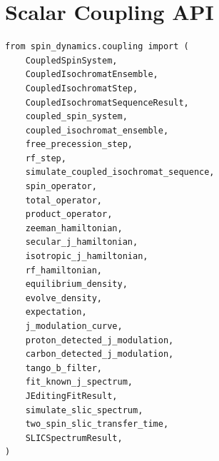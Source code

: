\documentclass[11pt,oneside]{report}
\begin{document}
\section{Scalar Coupling API}

\begin{lstlisting}
from spin_dynamics.coupling import (
    CoupledSpinSystem,
    CoupledIsochromatEnsemble,
    CoupledIsochromatStep,
    CoupledIsochromatSequenceResult,
    coupled_spin_system,
    coupled_isochromat_ensemble,
    free_precession_step,
    rf_step,
    simulate_coupled_isochromat_sequence,
    spin_operator,
    total_operator,
    product_operator,
    zeeman_hamiltonian,
    secular_j_hamiltonian,
    isotropic_j_hamiltonian,
    rf_hamiltonian,
    equilibrium_density,
    evolve_density,
    expectation,
    j_modulation_curve,
    proton_detected_j_modulation,
    carbon_detected_j_modulation,
    tango_b_filter,
    fit_known_j_spectrum,
    JEditingFitResult,
    simulate_slic_spectrum,
    two_spin_slic_transfer_time,
    SLICSpectrumResult,
)
\end{lstlisting}
\end{document}
